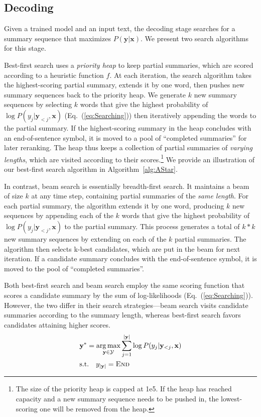 \documentclass[letterpaper]{article} %
\DeclareMathOperator*{\argmax}{arg\,max}
\begin{document}
\subsection{Decoding}
Given a trained model and an input text, the decoding stage searches for a summary sequence that maximizes $P(\mathbf{y}|\mathbf{x})$.
We present two search algorithms for this stage.

Best-first search uses a \emph{priority heap} to keep partial summaries, which are scored according to a heuristic function $f$. %
At each iteration, the search algorithm takes the highest-scoring partial summary, extends it by one word, then pushes new summary sequences back to the priority heap. 
We generate $k$ new summary sequences by selecting $k$ words that give the highest probability of $\log P(y_j|\mathbf{y}_{<j}, \mathbf{x})$ (Eq.~(\ref{eq:Searching})) then iteratively appending the words to the partial summary. 
If the highest-scoring summary in the heap concludes with an end-of-sentence symbol, it is moved to a pool of ``completed summaries'' for later reranking.
The heap thus keeps a collection of partial summaries of \emph{varying lengths}, which are visited according to their scores.\footnote{The size of the priority heap is capped at 1e5. If the heap has reached capacity and a new summary sequence needs to be pushed in, the lowest-scoring one will be removed from the heap.}
We provide an illustration of our best-first search algorithm in Algorithm~\ref{alg:AStar}.

In contrast, beam search is essentially breadth-first search.
It maintains a beam of size $k$ at any time step, containing partial summaries of the \emph{same length}.
For each partial summary, the algorithm extends it by one word, producing $k$ new sequences by appending each of the $k$ words that give the highest probability of $\log P(y_j|\mathbf{y}_{<j}, \mathbf{x})$ to the partial summary.
This process generates a total of $k*k$ new summary sequences by extending on each of the $k$ partial summaries.
The algorithm then selects k-best candidates, which are put in the beam for next iteration. 
If a candidate summary concludes with the end-of-sentence symbol, it is moved to the pool of ``completed summaries''.

Both best-first search and beam search employ the same scoring function that scores a candidate summary by the sum of log-likelihoods (Eq.~(\ref{eq:Searching})).
However, the two differ in their search strategies---beam search visits candidate summaries according to the summary length, whereas best-first search favors candidates attaining higher scores.
\begin{equation}
\label{eq:Searching}
\begin{split}
    &\mathbf{y}^{*}= \argmax_{\mathbf{y} \in \mathcal{Y}} \sum_{j=1}^{|\mathbf{y}|}\log P(y_j|\mathbf{y}_{<j}, \mathbf{x})\\
    &\mbox{s.t.} \quad y_{|\mathbf{y}|} = \textsc{End}
\end{split}
\end{equation}
\end{document}
